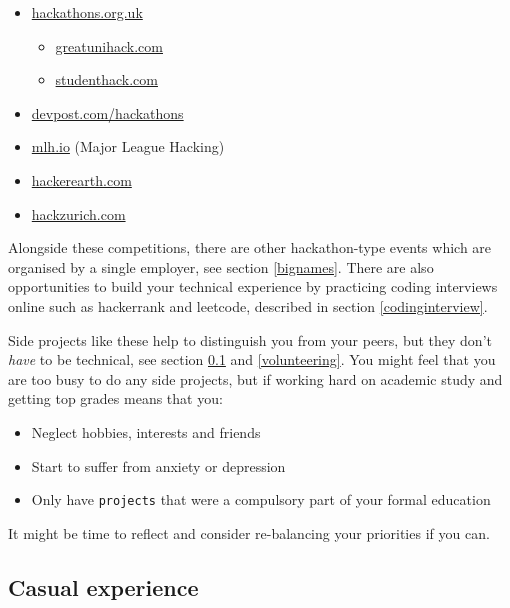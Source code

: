 \documentclass[
]{book}
\providecommand{\tightlist}{%
  \setlength{\itemsep}{0pt}\setlength{\parskip}{0pt}}
\begin{document}
\begin{itemize}
\tightlist
\item
  \href{https://www.hackathons.org.uk/}{hackathons.org.uk}

  \begin{itemize}
  \tightlist
  \item
    \href{https://greatunihack.com/}{greatunihack.com}
  \item
    \href{https://www.studenthack.com/}{studenthack.com}
  \end{itemize}
\item
  \href{https://devpost.com/hackathons}{devpost.com/hackathons}
\item
  \href{https://mlh.io/}{mlh.io} (Major League Hacking)
\item
  \href{https://www.hackerearth.com/}{hackerearth.com}
\item
  \href{https://hackzurich.com/}{hackzurich.com}
\end{itemize}

Alongside these competitions, there are other hackathon-type events which are organised by a single employer, see section \ref{bignames}. There are also opportunities to build your technical experience by practicing coding interviews online such as hackerrank and leetcode, described in section \ref{codinginterview}.

Side projects like these help to distinguish you from your peers, but they don't \emph{have} to be technical, see section \ref{casual} and \ref{volunteering}. You might feel that you are too busy to do any side projects, but if working hard on academic study and getting top grades means that you:

\begin{itemize}
\tightlist
\item
  Neglect hobbies, interests and friends
\item
  Start to suffer from anxiety or depression
\item
  Only have \texttt{projects} that were a compulsory part of your formal education
\end{itemize}

It might be time to reflect and consider re-balancing your priorities if you can.

\hypertarget{casual}{%
\subsection{Casual experience}\label{casual}}
\end{document}
